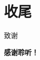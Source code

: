 \section{收尾}
{\wavesbg
    \begin{frame}[c]{致谢}
        \begin{center}
            \LARGE\textbf{感谢聆听！}
        \end{center}
    \end{frame}
}

\begin{frame}[t, allowframebreaks]{\refname}
    \nocite{*}
    \printbibliography[heading=none]
\end{frame}
